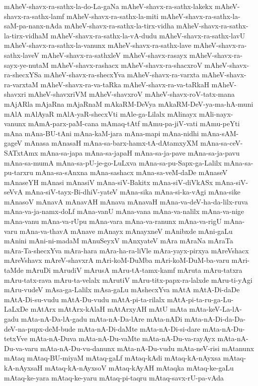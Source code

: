 {mAheV-shavx-ra-sathx-la-do-La-gaNa
mAheV-shavx-ra-sathx-lakekx
mAheV-shavx-ra-sathx-lamf
mAheV-shavx-ra-sathx-la-miti
mAheV-shavx-ra-sathx-la-saM-pa-nanx-nAda
mAheV-shavx-ra-sathx-la-tirx-vidha
mAheV-shavx-ra-sathx-la-tirx-vidhaM
mAheV-shavx-ra-sathx-la-vA-dudu
mAheV-shavx-ra-sathx-lavU
mAheV-shavx-ra-sathx-la-vanunx
mAheV-shavx-ra-sathx-lave
mAheV-shavx-ra-sathx-laveV
mAheV-shavx-ra-sathxleV
mAheV-shavx-rasayx
mAheV-shavx-ra-sayx-ye-nutaM
mAheV-shavx-rashacx
mAheV-shavx-ra-shacxroV
mAheV-shavx-ra-shecxYSa
mAheV-shavx-ra-shecxYva
mAheV-shavx-ra-varxta
mAheV-shavx-ra-varxtaM
mAheV-shavx-ra-va-taRka
mAheV-shavx-ra-va-taRkaH
mAheV-shavxri
mAheV-shavxriVM
mAheV-shavxroV
mAheV-shavx-roV-tatx-mana
mAjARla
mAjaRna
mAjaRnaM
mAkaRM-DeVya
mAkaRM-DeV-ya-ma-hA-muni
mAlA
mAlAyaR
mAlA-yaR-shecxVti
mAle-ga-Lilalx
mAlinayx
mAli-nayx-vanunx
mAmA-parx-paM-cana
mAmaq-tAtf
mAmu-pa-jiV-vati
mAmu-peYti
mAna
mAna-BU-tAni
mAna-kaM-jara
mAna-mapi
mAna-nidhi
mAna-sAM-gageV
mAnasa
mAnasaH
mAna-sa-barx-hamx-tA-dAtamxyXM
mAna-sa-ceV-SATxtAmx
mAna-sa-japa
mAna-sa-japaH
mAna-sa-ja-pave
mAna-sa-ja-pavu
mAna-sa-mumA
mAna-sa-pU-je-go-LuLxva
mAna-sa-pu-Sapx-ga-Lalilx
mAna-sa-pu-tarxru
mAna-sa-sAnxna
mAna-sashacx
mAna-sa-veM-daDe
mAnaseV
mAnaseYH
mAnasi
mAnasiV
mAna-siV-Bakitx
mAna-siV-diVkASx
mAna-siV-seVvA
mAna-siV-tayx-Bi-dhiV-yateV
mAna-sika
mAna-si-ka-vAgi
mAna-sike
mAnasoV
mAnavA
mAnavAH
mAnava
mAnavaH
mAna-va-deV-ha-da-lilx-ruva
mAna-va-ja-namx-doLf
mAna-vanU
mAna-vana
mAna-va-nalilx
mAna-va-nige
mAna-vanu
mAna-va-rUpu
mAna-vara
mAna-va-ranunx
mAna-va-rigU
mAna-varu
mAna-va-thavA
mAnave
mAnayx
mAnayxneV
mAnibxde
mAni-gaLu
mAnini
mAni-ni-madaM
mAnuSeyxV
mAnxyateV
mAra
mAraNa
mAraTa
mAra-Ta-shecxYva
mAra-hara
mAra-ha-ra-liVle
mAra-yayx-pirxya
mAreVshacx
mAreVshavx
mAreV-shavxrA
mAri-koM-DuMba
mAri-koM-DuM-ba-varu
mAri-taMde
mAruDi
mArudiV
mArusA
mAru-tA-tamx-kamf
mAruta
mAru-tatxra
mAru-tatx-rava
mAru-ta-velalx
mArutiV
mAru-titx-papx-ra-lalxde
mAru-ti-yAgi
mAru-vudeV
mAsa-ga-Lalilx
mAsa-gaLu
mAshecxYva
mAtA
mAtA-Di-daDe
mAtA-Di-su-vudu
mAtA-Du-vudu
mAtA-pi-ta-rilalx
mAtA-pi-ta-ru-ga-Lu-LaLxDe
mAtArx
mAtArx-kAlaH
mAtArxyAH
mAtU
mAta
mAta-keV-La-lA-gadu
mAta-nA-Da-lA-gadu
mAta-nA-Da-lAre
mAta-nADi
mAta-nA-Di-da-Da-deV-na-pupx-deM-bude
mAta-nA-Di-daMte
mAta-nA-Di-si-dare
mAta-nA-Du-tetxVve
mAta-nA-Duva
mAta-nA-Du-vaMte
mAta-nA-Du-va-rayAyx
mAta-nA-Du-va-varu
mAta-nA-Du-vu-danunx
mAta-nA-Du-vudu
mAta-neV-risi
mAtanunx
mAtaq
mAtaq-BU-miyaM
mAtaq-gaLf
mAtaq-kAdi
mAtaq-kA-nAyxsa
mAtaq-kA-nAyxsaH
mAtaq-kA-nAyxsoV
mAtaq-kAyAH
mAtaqka
mAtaq-ke-gaLu
mAtaq-ke-yara
mAtaq-ke-yaru
mAtaq-pi-taqru
mAtaq-savx-rU-pa-vAda
}
